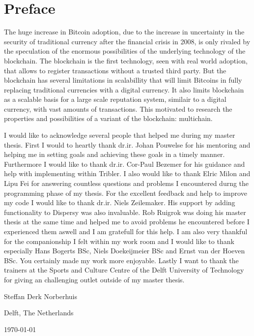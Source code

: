 \chapter*{Preface}
The huge increase in Bitcoin adoption, 
due to the increase in uncertainty in the security of traditional currency 
after the financial crisis in 2008, 
is only rivaled by the speculation of the enormous possibilities 
of the underlying technology of the blockchain.
The blockchain is the first technology, seen with real world adoption,
that allows to register transactions without a trusted third party.
But the blockchain has several limitations in scalabillity 
that will limit Bitcoins in fully replacing traditional currencies with a digital currency.
It also limits blockchain as a scalable basis for a large scale reputation system, 
similair to a digital currency, with vast amounts of transactions.
This motivated to research the properties and possibilities of a variant of the blockchain:
multichain.

\vspace{1\baselineskip}

\noindent
I would like to acknowledge several people that helped me during my master thesis.
First I would to heartly thank dr.ir. Johan Pouwelse for his mentoring and helping me in setting goals and achieving these goals in a timely manner.
Furthermore I would like to thank dr.ir. Cor-Paul Bezemer for his guidance and help with implementing within Tribler. 
I also would like to thank Elric Milon and Lipu Fei for answering countless questions and problems I encountered durng the programming phase of my thesis.
For the excellent feedback and help to improve my code I would like to thank dr.ir. Niels Zeilemaker.
His support by adding functionality to Dispersy was also invaluable.
Rob Ruigrok was doing his master thesis at the same time
and helped me to avoid problems he encountered before I experienced them aswell and
I am gratefull for this help.
I am also very thankful for the companionship I felt within my work room 
and I would like to thank especially Hans Bogerts BSc, Niels Doekeijmeier BSc and Ernst van der Hoeven BSc.
You certainly made my work more enjoyable.
Lastly I want to thank the trainers at the Sports and Culture Centre of the Delft University of Technology for giving an challenging outlet outside of my master thesis.

\vspace{1\baselineskip}

\noindent
Steffan Derk Norberhuis

\vspace{1\baselineskip}

\noindent
Delft, The Netherlands

\noindent
\today
